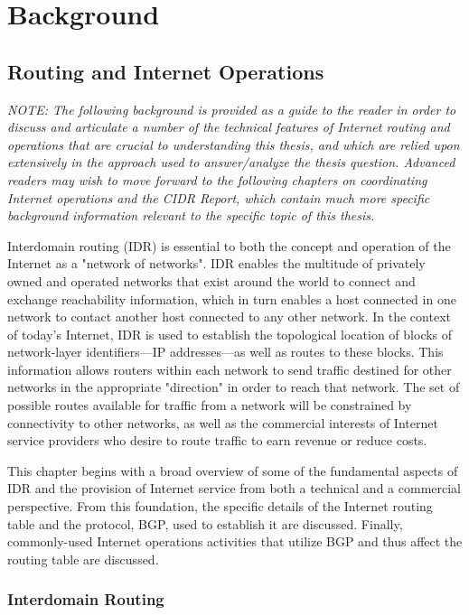 \chapter{Background}

\section{Routing and Internet Operations}

\emph{NOTE: The following background is provided as a guide to the reader in order to discuss and articulate a number of the technical features of Internet routing and operations that are crucial to understanding this thesis, and which are relied upon extensively in the approach used to answer/analyze the thesis question. Advanced readers may wish to move forward to the following chapters on coordinating Internet operations and the CIDR Report, which contain much more specific background information relevant to the specific topic of this thesis.}

Interdomain routing (IDR) is essential to both the concept and operation of the Internet as a "network of networks". IDR enables the multitude of privately owned and operated networks that exist around the world to connect and exchange reachability information, which in turn enables a host connected in one network to contact another host connected to any other network. In the context of today's Internet, IDR is used to establish the topological location of blocks of network-layer identifiers---IP addresses---as well as routes to these blocks. This information allows routers within each network to send traffic destined for other networks in the appropriate "direction" in order to reach that network. The set of possible routes available for traffic from a network will be constrained by connectivity to other networks, as well as the commercial interests of Internet service providers who desire to route traffic to earn revenue or reduce costs.

This chapter begins with a broad overview of some of the fundamental aspects of IDR and the provision of Internet service from both a technical and a commercial perspective. From this foundation, the specific details of the Internet routing table and the protocol, BGP, used to establish it are discussed. Finally, commonly-used Internet operations activities that utilize BGP and thus affect the routing table are discussed.

\subsection{Interdomain Routing}

